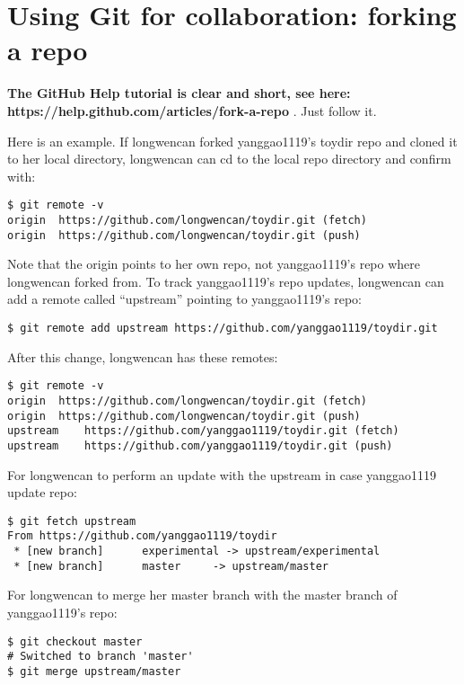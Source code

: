 \documentclass{article} %
\newcommand{\q}[1]{``#1''}
\begin{document}
\section{Using Git for collaboration: forking a repo}

\textbf{The GitHub Help tutorial is clear and short, see here: https://help.github.com/articles/fork-a-repo} . Just follow it. 

Here is an example. If longwencan forked yanggao1119's toydir repo and cloned it to her local directory, longwencan can cd to the local repo directory and confirm with:

\begin{lstlisting}
$ git remote -v
origin  https://github.com/longwencan/toydir.git (fetch)
origin  https://github.com/longwencan/toydir.git (push)
\end{lstlisting}

Note that the origin points to her own repo, not yanggao1119's repo where longwencan forked from. To track yanggao1119's repo updates, longwencan can add a remote called \q{upstream} pointing to yanggao1119's repo:

\begin{lstlisting}
$ git remote add upstream https://github.com/yanggao1119/toydir.git
\end{lstlisting}

After this change, longwencan has these remotes:

\begin{lstlisting}
$ git remote -v
origin  https://github.com/longwencan/toydir.git (fetch)
origin  https://github.com/longwencan/toydir.git (push)
upstream    https://github.com/yanggao1119/toydir.git (fetch)
upstream    https://github.com/yanggao1119/toydir.git (push)
\end{lstlisting}

For longwencan to perform an update with the upstream in case yanggao1119 update repo:

\begin{lstlisting}
$ git fetch upstream
From https://github.com/yanggao1119/toydir
 * [new branch]      experimental -> upstream/experimental
 * [new branch]      master     -> upstream/master
\end{lstlisting}

For longwencan to merge her master branch with the master branch of yanggao1119's repo:

\begin{lstlisting}
$ git checkout master
# Switched to branch 'master'
$ git merge upstream/master
\end{lstlisting}
\end{document}
